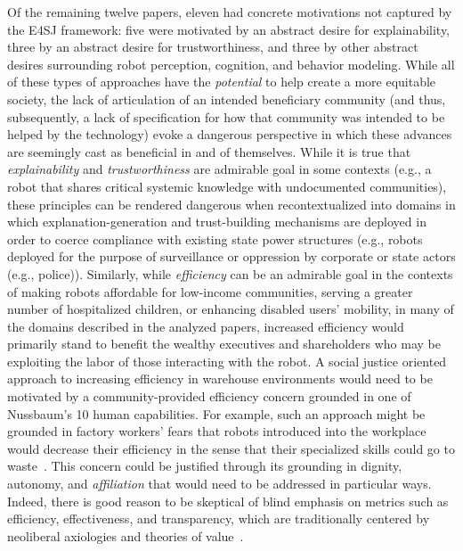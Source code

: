 \documentclass[letterpaper]{article} %
\begin{document}
Of the remaining twelve papers, eleven had concrete motivations not captured by the E4SJ framework: five were motivated by an abstract desire for explainability, three by an abstract desire for trustworthiness, and three by other abstract desires surrounding robot perception, cognition, and behavior modeling. While all of these types of approaches have the \textit{potential} to help create a more equitable society, the lack of articulation of an intended beneficiary community (and thus, subsequently, a lack of specification for how that community was intended to be helped by the technology) evoke a dangerous perspective in which these advances are seemingly cast as beneficial in and of themselves.
While it is true that \textit{explainability} and \textit{trustworthiness} are admirable goal in some contexts (e.g., a robot that shares critical systemic knowledge with undocumented communities), these principles can be rendered dangerous when recontextualized into domains in which explanation-generation and trust-building mechanisms are deployed in order to coerce compliance with existing state power structures (e.g., robots deployed for the purpose of surveillance or oppression by corporate or state actors (e.g., police)).
Similarly, while \textit{efficiency} can be an admirable goal in the contexts of making robots affordable for low-income communities, serving a greater number of hospitalized children, or enhancing disabled users' mobility, in many of the domains described in the analyzed papers, increased efficiency would primarily stand to benefit the wealthy executives and shareholders who may be exploiting the labor of those interacting with the robot. A social justice oriented approach to increasing efficiency in warehouse environments would need to be motivated by a community-provided efficiency concern grounded in one of Nussbaum's 10 human capabilities. For example, such an approach might be grounded in factory workers' fears that robots introduced into the workplace would decrease their efficiency in the sense that their specialized skills could go to waste~\cite{meissner2020friend}. This concern could be justified through its grounding in dignity, autonomy, and \textit{affiliation} that would need to be addressed in particular ways.
Indeed, there is good reason to be skeptical of blind emphasis on metrics such as efficiency, effectiveness, and transparency, which are traditionally centered by neoliberal axiologies and theories of value~\cite{power2003evaluating,van2014neoliberal}.
\end{document}
